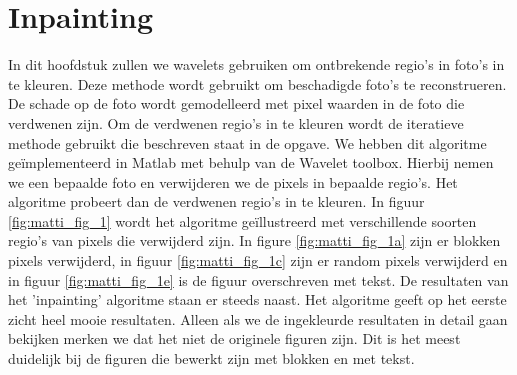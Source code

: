 \section{Inpainting}

In dit hoofdstuk zullen we wavelets gebruiken om ontbrekende regio's in foto's in te kleuren. Deze methode wordt gebruikt om beschadigde foto's te reconstrueren. De schade op de foto wordt gemodelleerd met pixel waarden in de foto die verdwenen zijn. Om de verdwenen regio's in te kleuren wordt de iteratieve methode gebruikt die beschreven staat in de opgave. We hebben dit algoritme ge\"{i}mplementeerd in Matlab met behulp van de Wavelet toolbox. Hierbij nemen we een bepaalde foto en verwijderen we de pixels in bepaalde regio's. Het algoritme probeert dan de verdwenen regio's in te kleuren. 
\newline
\newline
In figuur \ref{fig:matti_fig_1} wordt het algoritme ge\"{i}llustreerd met verschillende soorten regio's van pixels die verwijderd zijn. In figure \ref{fig:matti_fig_1a} zijn er blokken pixels verwijderd, in figuur \ref{fig:matti_fig_1c} zijn er random pixels verwijderd en in figuur \ref{fig:matti_fig_1e} is de figuur overschreven met tekst. De resultaten van het 'inpainting' algoritme staan er steeds naast. Het algoritme geeft op het eerste zicht heel mooie resultaten. Alleen als we de ingekleurde resultaten in detail gaan bekijken merken we dat het niet de originele figuren zijn. Dit is het meest duidelijk bij de figuren die bewerkt zijn met blokken en met tekst.


